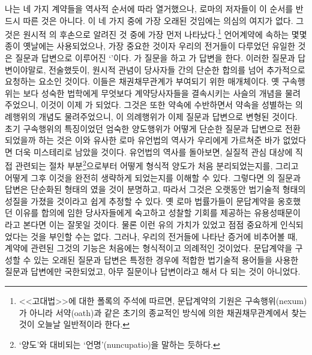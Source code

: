 나는 네 가지 계약들을 역사적 순서에 따라 열거했으나,
로마의  저자들이 이 순서를 반드시 따른 것은 아니다.
이 네 가지 중에 가장 오래된 것임에는 의심의 여지가 없다.
그것은 원시적 의 후손으로 알려진 것 중에 가장 먼저 나타났다.\footnote{%
  <<고대법>>에 대한 폴록의 주석에 따르면,
  문답계약의 기원은 구속행위(nexum)가 아니라
  서약(oath)과 같은 초기의 종교적인 방식에 의한 채권채무관계에서 찾는 것이
  오늘날
  일반적이라 한다.
  }
언어계약에 속하는 몇몇 종이 옛날에는 사용되었으나,
가장 중요한 것이자 우리의 전거들이 다루었던 유일한 것은
질문과 답변으로 이루어진 `'이다.
가 질문을 하고 가 답변을 한다.
이러한 질문과 답변이야말로, 전술했듯이,
원시적 관념이
당사자들 간의 단순한 합의를 넘어 추가적으로 요청하는 요소인 것이다.
이들은 채권채무관계가 부여되기 위한 매개체이다.
옛 구속행위는
보다 성숙한 법학에게 무엇보다
계약당사자들을 결속시키는 사슬의 개념을 물려주었으니,
이것이 이제 가 되었다.
그것은 또한 약속에 수반하면서 약속을 성별하는
의례행위의 개념도 물려주었으니,
이 의례행위가 이제 질문과 답변으로 변형된 것이다.
초기 구속행위의 특징이었던 엄숙한 양도행위가
어떻게 단순한 질문과 답변으로 전환되었을까 하는 것은
이와 유사한 로마 유언법의 역사가 우리에게 가르쳐준 바가 없었다면
더욱 미스테리로 남았을 것이다.
유언법의 역사를 돌아보면,
실질적 관심 대상에 직접 관련되는 절차 부분\footnote{%
  `양도'와 대비되는 `언명'(nuncupatio)을 말하는 듯하다.
}으로부터
어떻게
형식적 양도가
처음 분리되었는지를,
그리고 어떻게 그후 이것을 완전히 생략하게 되었는지를
이해할 수 있다.
그렇다면
의 질문과 답변은 단순화된 형태의 였을 것이 분명하고,
따라서
그것은 오랫동안 법기술적 형태의 성질을 가졌을 것이라고 쉽게 추정할 수 있다.
옛 로마 법률가들이 문답계약을 옹호했던 이유를
합의에 임한 당사자들에게 숙고하고 성찰할 기회를 제공하는
유용성때문이라고 본다면 이는 잘못일 것이다.
물론 이런 유의 가치가 있었고 점점 중요하게
인식되었다는 것을 부인할 수는 없다.
그러나, 우리의 전거들에 나타난 증거에 비추어볼 때,
계약에 관련된 그것의 기능은 처음에는 형식적이고 의례적인 것이었다.
문답계약을 구성할 수 있는 오래된 질문과 답변은
특정한 경우에 적합한 법기술적 용어들을 사용한
질문과 답변에만 국한되었고,
아무 질문이나 답변이라고 해서 다 되는 것이 아니었다.

